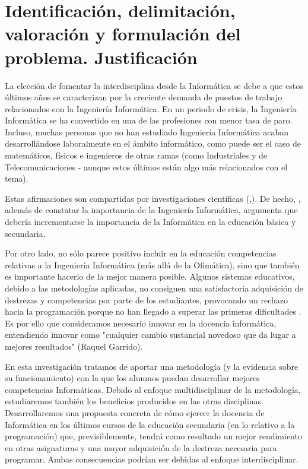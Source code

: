 \documentclass[palatino,miniheader]{apuntesURJC}
\begin{document}
\section{Identificación, delimitación, valoración y formulación del problema. Justificación}

La elección de fomentar la interdisciplina desde la Informática se debe a que estos últimos años se caracterizan por la creciente demanda de puestos de trabajo relacionados con la Ingeniería Informática.
%
En un periodo de crisis, la Ingeniería Informática se ha convertido en una de las profesiones con menor tasa de paro. 
%
Incluso, muchas personas que no han estudiado Ingeniería Informática acaban desarrollándose laboralmente en el ámbito informático, como puede ser el caso de  matemáticos, físicos e ingenieros de otras ramas (como Industriales y de Telecomunicaciones - aunque estos últimos están algo más relacionados con el tema).

Estas afirmaciones son compartidas por investigaciones científicas (\cite{CSIsImportant},\cite{CSArguing}). 
%
De hecho, \cite{CSArguing}, además de constatar la importancia de la Ingeniería Informática, argumenta que debería incrementarse la importancia de la Informática en la educación básica y secundaria.

Por otro lado, no sólo parece positivo incluir en la educación competencias relativas a la Ingeniería Informática (más allá de la Ofimática), sino que también es importante hacerlo de la mejor manera posible.
%
Algunos sistemas educativos, debido a las metodologías aplicadas, no consiguen una satisfactoria adquisición de destrezas y competencias por parte de los estudiantes, provocando un rechazo hacia la programación porque no han llegado a superar las primeras dificultades \cite{CSArguing}. 
%
Es por ello que consideramos necesario innovar en la docencia informática, entendiendo innovar como "cualquier cambio sustancial novedoso que da lugar a mejores resultados" (Raquel Garrido).

En esta investigación tratamos de aportar una metodología (y la evidencia sobre su funcionamiento) con la que los alumnos puedan desarrollar mejores competencias Informáticas. 
%
Debido al enfoque multidisciplinar de la metodología, estudiaremos también los beneficios producidos en las otras disciplinas.
%
Desarrollaremos una propuesta concreta de cómo ejercer la docencia de Informática en los últimos cursos de la educación secundaria (en lo relativo a la programación) que, previsiblemente, tendrá como resultado un mejor rendimiento en otras asignaturas y una mayor adquisición de la destreza necesaria para programar.
%
Ambas consecuencias podrían ser debidas al enfoque interdisciplinar.
\end{document}
